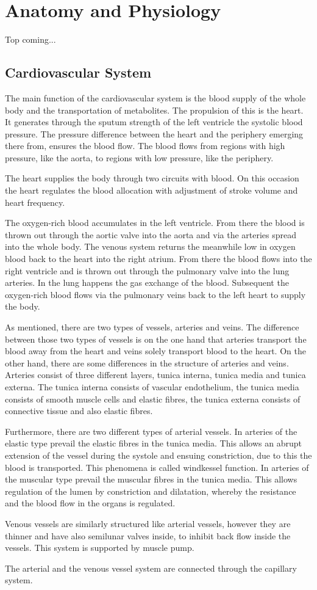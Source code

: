 \chapter{Anatomy and Physiology}
Top coming...

\section{Cardiovascular System}
The main function of the cardiovascular system is the blood supply of the whole body and the transportation of metabolites. The propulsion of this is the heart. It generates through the sputum strength of the left ventricle the systolic blood pressure. The pressure difference between the heart and the periphery emerging there from, ensures the blood flow. The blood flows from regions with high pressure, like the aorta, to regions with low pressure, like the periphery.

The heart supplies the body through two circuits with blood. On this occasion the heart regulates the blood allocation with adjustment of stroke volume and heart frequency.

The oxygen-rich blood accumulates in the left ventricle. From there the blood is thrown out through the aortic valve into the aorta and via the arteries spread into the whole body. The venous system returns the meanwhile low in oxygen blood back to the heart into the right atrium. From there the blood flows into the right ventricle and is thrown out through the pulmonary valve into the lung arteries. In the lung happens the gas exchange of the blood. Subsequent the oxygen-rich blood flows via the pulmonary veins back to the left heart to supply the body.

As mentioned, there are two types of vessels, arteries and veins. The difference between those two types of vessels is on the one hand that arteries transport the blood away from the heart and veins solely transport blood to the heart. On the other hand, there are some differences in the structure of arteries and veins.
Arteries consist of three different layers, tunica interna, tunica media and tunica externa. The tunica interna consists of vascular endothelium,  the tunica media consists of smooth muscle cells and elastic fibres, the tunica externa consists of connective tissue and also elastic fibres.

Furthermore, there are two different types of arterial vessels. In arteries of the elastic type prevail the elastic fibres in the tunica media. This allows an abrupt extension of the vessel during the systole and ensuing constriction, due to this the blood is transported. This phenomena is called windkessel function. In arteries of the muscular type prevail the muscular fibres in the tunica media. This allows regulation of the lumen by constriction and dilatation, whereby the resistance and the blood flow in the organs is regulated.

Venous vessels are similarly structured like arterial vessels, however they are thinner and have also semilunar valves inside, to inhibit back flow inside the vessels. This system is supported by muscle pump.

The arterial and the venous vessel system are connected through the capillary system.
